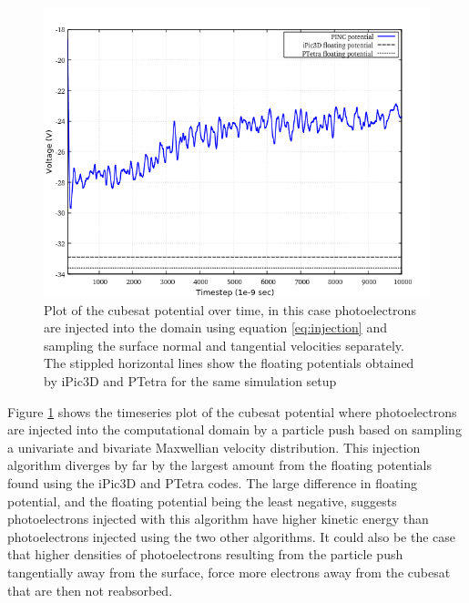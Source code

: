 \begin{figure}[H]
    \centering
    \includegraphics[scale=0.4]{figures/DECA/PhotoelectronInjectionByDoubleGauss/pDoubleGauss.png}
    \caption{Plot of the cubesat potential over time, in this case photoelectrons are injected into the domain using equation \eqref{eq:injection} and sampling the surface normal and tangential velocities separately. The stippled horizontal lines show the floating potentials obtained by iPic3D and PTetra for the same simulation setup}
    \label{fig:pDoubleGauss}
\end{figure}

\raggedbottom

Figure \ref{fig:pDoubleGauss} shows the timeseries plot of the cubesat potential where photoelectrons are injected into the computational domain by a particle push based on sampling a univariate and bivariate Maxwellian velocity distribution. This injection algorithm diverges by far by the largest amount from the floating potentials found using the iPic3D and PTetra codes. The large difference in floating potential, and the floating potential being the least negative, suggests photoelectrons injected with this algorithm have higher kinetic energy than photoelectrons injected using the two other algorithms. It could also be the case that higher densities of photoelectrons resulting from the particle push tangentially away from the surface, force more electrons away from the cubesat that are then not reabsorbed.

\newpage

